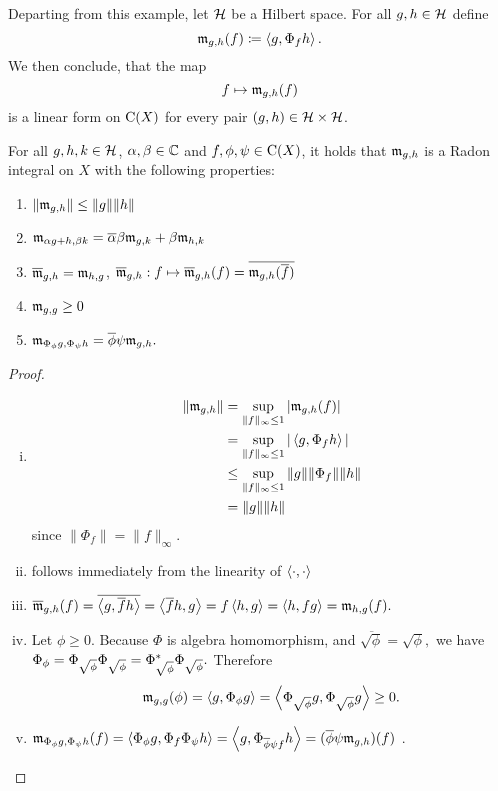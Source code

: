Departing from this example, let $\mathcal{H}$ be a Hilbert space.
For all $g , h \in \mathcal{H}$ define
\[
 \mathfrak{m}_{g, h} (f) \coloneqq \left\langle g, \Phi_f h \right\rangle.
\]
We then conclude, that the map 
\[
 f \mapsto \mathfrak{m}_{g,h} (f)
\]
is a linear form on $\operatorname{C} (X)$ for every pair $(g, h) \in \mathcal{H} \times \mathcal{H}$.
\begin{thrm} \label{measureproperties}
For all $g, h,k \in \mathcal{H}$, $\alpha, \beta \in \mathbb{C}$ and $f, \phi, \psi \in 
\operatorname{C}(X)$, it holds that $\mathfrak{m}_{g,h}$ is a Radon integral on $X$ with the following 
properties:
\begin{enumerate}[{(}i{)}]
 \item $\| \mathfrak{m}_{g,h}\| \leq \|g\| \|h\|$
 \item $\mathfrak{m}_{\alpha g + h, \beta k} = \overline{\alpha}\beta \mathfrak{m}_{g,k} + 
 \beta \mathfrak{m}_{h,k}$
 \item $\overline{\mathfrak{m}}_{g,h} = \mathfrak{m}_{h,g}$, $\overline{\mathfrak{m}}_{g,h} : 
 f \mapsto \overline{\mathfrak{m}}_{g,h}(f) = \overline{\mathfrak{m}_{g,h}(\overline{f})}$
 \item $\mathfrak{m}_{g,g} \geq 0$
 \item $\mathfrak{m}_{\Phi_\phi g, \Phi_\psi h} = \overline{\phi} \psi \mathfrak{m}_{g,h}.$
\end{enumerate}

\end{thrm}

\begin{proof}
 \begin{enumerate}[(i)]
  \item \begin{align*}
         \| \mathfrak{m}_{g,h} \| &= \sup\limits_{\| f \| _\infty \leq 1} | \mathfrak{m}_{g,h}(f) | \\
			&= \sup\limits_{\| f \| _\infty \leq 1} | \left\langle g, \Phi_f h \right\rangle | \\
			&\leq \sup\limits_{\| f \| _\infty \leq 1} \| g \| \|\Phi_f \| \| h\| \\
			&= \|g\| \|h\|
        \end{align*}
  since $\|\Phi_f \| =\| f \|_\infty$.
 \item follows immediately from the linearity of $\left\langle \cdot , \cdot \right\rangle$
 
 \item $\overline{\mathfrak{m}}_{g,h}(f) = \overline{\left\langle g, \overline{f}h \right\rangle} = 
       \left\langle \overline{f}h ,g \right\rangle =	f\left\langle h,g \right\rangle = \left\langle h, fg \right\rangle = \mathfrak{m}_{h,g}(f).$
	
       \item Let $\phi \geq 0$. Because $\Phi$ is algebra homomorphism, and 
       $\overline{\sqrt{\phi}} = \sqrt{\phi},$ we have 
	$ \Phi_\phi = \Phi_{\sqrt{\phi}} \Phi_{\sqrt{\phi}} =
	  \Phi^{*}_{\sqrt{\phi}} \Phi_{\sqrt{\phi}}.$
	Therefore 
	\[\mathfrak{m}_{g,g}(\phi) = \left\langle g, \Phi_\phi g \right\rangle = \left\langle \Phi_{\sqrt{\phi}}g,
	\Phi_{\sqrt{\phi}}g \right\rangle \geq 0. \]
	
 \item	$\mathfrak{m}_{\Phi_\phi g, \Phi_\psi h} (f ) = \left\langle \Phi_\phi g, \Phi_f 
	\Phi_\psi h \right\rangle = \left\langle g , \Phi_{\overline{\phi} \psi f} h  \right\rangle = (\overline{\phi}
      \psi \mathfrak{m}_{g,h})(f)$ .

\end{enumerate}

\end{proof}

